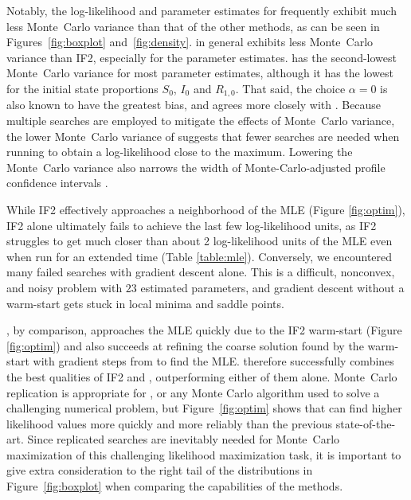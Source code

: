 Notably, the log-likelihood and parameter estimates for  frequently exhibit much less Monte~Carlo variance than that of the other methods, as can be seen in Figures~\ref{fig:boxplot} and~\ref{fig:density}. 
 in general exhibits less Monte~Carlo variance than IF2, especially for the parameter estimates. 
 has the second-lowest Monte~Carlo variance for most parameter estimates, although it has the lowest for the initial state proportions $S_0$, $I_0$ and $R_{1,0}$.
That said, the choice $\alpha=0$ is also known to have the greatest bias, and  agrees more closely with . 
Because multiple searches are employed to mitigate the effects of Monte~Carlo variance, the lower Monte~Carlo variance of  suggests that fewer searches are needed when running  to obtain a log-likelihood close to the maximum. 
Lowering the Monte~Carlo variance also narrows the width of Monte-Carlo-adjusted profile confidence intervals \citep{ionides17}.


While IF2 effectively approaches a neighborhood of the MLE (Figure \ref{fig:optim}), IF2 alone ultimately fails to achieve the last few log-likelihood units, as IF2 struggles to get much closer than about 2 log-likelihood units of the MLE even when run for an extended time (Table \ref{table:mle}).
Conversely, we encountered many failed searches with gradient descent alone. 
This is a difficult, nonconvex, and noisy problem with $23$ estimated parameters, and gradient descent without a warm-start gets stuck in local minima and saddle points.

, by comparison, approaches the MLE quickly due to the IF2 warm-start (Figure \ref{fig:optim}) and also succeeds at refining the coarse solution found by the warm-start with gradient steps from  to find the MLE.
 therefore successfully combines the best qualities of IF2 and , outperforming either of them alone.
Monte~Carlo replication is appropriate for , or any Monte Carlo algorithm used to solve a challenging numerical problem, but Figure~\ref{fig:optim} shows that  can find higher likelihood values more quickly and more reliably than the previous state-of-the-art. 
Since replicated searches are inevitably needed for Monte~Carlo maximization of this challenging likelihood maximization task, it is important to give extra consideration to the right tail of the distributions in Figure~\ref{fig:boxplot} when comparing the capabilities of the methods. 


